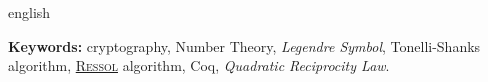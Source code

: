\begin{resumo}[Abstract]
        \begin{otherlanguage*}{english}

                \vspace{\onelineskip}
                
                \noindent
                \textbf{Keywords:} cryptography, Number Theory, \textit{Legendre Symbol}, Tonelli-Shanks algorithm, \hyperref[algo:ressol]{\textsc{Ressol}} algorithm, Coq, \textit{Quadratic Reciprocity Law}.

        \end{otherlanguage*}
\end{resumo}